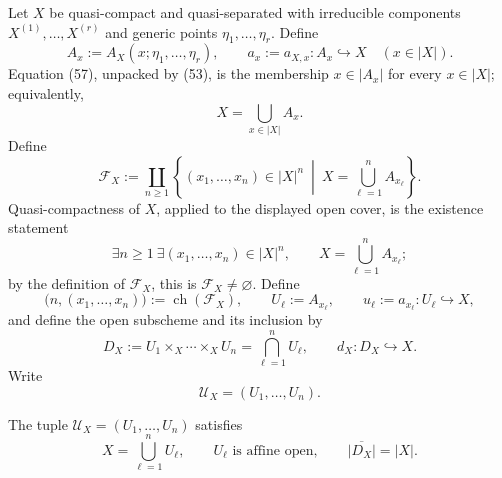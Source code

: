 \begin{definition}
  \label{def:nagata-dense-affine-cover}

  Let $X$ be quasi-compact and quasi-separated with irreducible components
  $X^{(1)},\ldots,X^{(r)}$ and generic points
  $\eta_1,\ldots,\eta_r$.  Define
  \[
    A_x:=A_X(x;\eta_1,\ldots,\eta_r),
    \qquad a_x:=a_{X,x}\colon A_x\hookrightarrow X
    \quad(x\in|X|).
  \]
  Equation (57), unpacked by (53), is the membership
  $x\in|A_x|$ for every $x\in|X|$; equivalently,
  \[
    X=\bigcup_{x\in|X|}A_x.
  \]
  Define
  \[
    \mathscr F_X
      :=\coprod_{n\geq1}
        \left\{
          (x_1,\ldots,x_n)\in|X|^n\ \middle|\
          X=\bigcup_{\ell=1}^nA_{x_\ell}
        \right\}.
  \]
  Quasi-compactness of $X$, applied to the displayed open cover, is the
  existence statement
  \[
    \exists n\geq1\ \exists(x_1,\ldots,x_n)\in|X|^n,\qquad
      X=\bigcup_{\ell=1}^nA_{x_\ell};
  \]
  by the definition of $\mathscr F_X$, this is
  $\mathscr F_X\neq\varnothing$.  Define
  \[
    \bigl(n,(x_1,\ldots,x_n)\bigr)
      :=\operatorname{ch}(\mathscr F_X),\qquad
    U_\ell:=A_{x_\ell},\qquad
    u_\ell:=a_{x_\ell}\colon U_\ell\hookrightarrow X,
  \]
  and define the open subscheme and its inclusion by
  \[
    D_X:=U_1\times_X\cdots\times_XU_n
      =\bigcap_{\ell=1}^nU_\ell,
    \qquad d_X\colon D_X\hookrightarrow X.                       \tag{58}
  \]
  Write
  \[
    \mathcal U_X=(U_1,\ldots,U_n).
  \]
\end{definition}

\begin{lemma}
  \label{lemma:nagata-dense-affine-cover}

  The tuple $\mathcal U_X=(U_1,\ldots,U_n)$ satisfies
  \[
    X=\bigcup_{\ell=1}^nU_\ell,\qquad
    U_\ell\text{ is affine open},
    \qquad
    \overline{|D_X|}=|X|.
  \]
\end{lemma}


